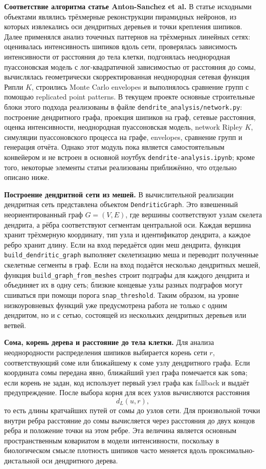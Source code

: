 \documentclass[12pt,a4paper]{article}
\begin{document}
\noindent\textbf{Соответствие алгоритма статье Anton-Sanchez et al.}
В статье исходными объектами являлись трёхмерные реконструкции пирамидных нейронов, из которых извлекались оси дендритных деревьев и точки крепления шипиков. Далее применялся анализ точечных паттернов на трёхмерных линейных сетях: оценивалась интенсивность шипиков вдоль сети, проверялась зависимость интенсивности от расстояния до тела клетки, подгонялась неоднородная пуассоновская модель с лог-квадратичной зависимостью от расстояния до сомы, вычислялась геометрически скорректированная неоднородная сетевая функция Рипли \(K\), строились Monte Carlo envelopes и выполнялось сравнение групп с помощью replicated point patterns. В текущем проекте основные строительные блоки этого подхода реализованы в файле \texttt{dendrite\_analysis/network.py}: построение дендритного графа, проекция шипиков на граф, сетевые расстояния, оценка интенсивности, неоднородная пуассоновская модель, network Ripley \(K\), симуляции пуассоновского процесса на графе, envelopes, сравнение групп и генерация отчёта. Однако этот модуль пока является самостоятельным конвейером и не встроен в основной ноутбук \texttt{dendrite-analysis.ipynb}; кроме того, некоторые элементы статьи реализованы приближённо, что отдельно описано ниже.

\noindent\textbf{Построение дендритной сети из мешей.}
В вычислительной реализации дендритная сеть представлена объектом \texttt{DendriticGraph}. Это взвешенный неориентированный граф \(G=(V,E)\), где вершины соответствуют узлам скелета дендрита, а рёбра соответствуют сегментам центральной оси. Каждая вершина хранит трёхмерную координату, тип узла и идентификатор дендрита, а каждое ребро хранит длину. Если на вход передаётся один меш дендрита, функция \texttt{build\_dendritic\_graph} выполняет скелетизацию меша и переводит полученные скелетные сегменты в граф. Если на вход подаётся несколько дендритных мешей, функция \texttt{build\_graph\_from\_meshes} строит подграфы для каждого дендрита и объединяет их в одну сеть; близкие концевые узлы разных подграфов могут сшиваться при помощи порога \texttt{snap\_threshold}. Таким образом, на уровне низкоуровневых функций уже предусмотрена работа не только с одним дендритом, но и с сетью, состоящей из нескольких дендритных деревьев или ветвей.

\noindent\textbf{Сома, корень дерева и расстояние до тела клетки.}
Для анализа неоднородности распределения шипиков выбирается корень сети \(r\), соответствующий соме или ближайшему к соме узлу дендритного графа. Если координата сомы передана явно, ближайший узел графа помечается как \texttt{soma}; если корень не задан, код использует первый узел графа как fallback и выдаёт предупреждение. После выбора корня для всех узлов вычисляются расстояния
\[
d_L(u,r),
\]
то есть длины кратчайших путей от сомы до узлов сети. Для произвольной точки внутри ребра расстояние до сомы вычисляется через расстояния до двух концов ребра и положение точки на этом ребре. Эта величина является основным пространственным ковариатом в модели интенсивности, поскольку в биологическом смысле плотность шипиков часто меняется вдоль проксимально-дистальной оси дендритного дерева.
\end{document}
